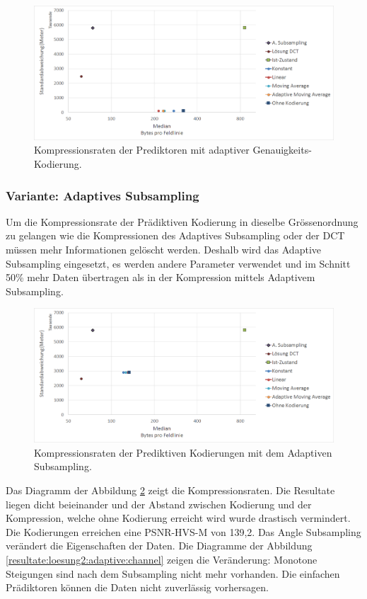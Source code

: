 \begin{figure}[!htbp]
	\center
	\includegraphics[width=1\textwidth,keepaspectratio]{./pictures/resultate/loesung2/variante0/resultate_byte.png}
	\caption{Kompressionsraten der Prediktoren mit adaptiver Genauigkeits-Kodierung.}
	\label{resultate:loesung2:simple:resultate_byte}
\end{figure}

\subsubsection{Variante: Adaptives Subsampling} \label{resultate:loesung2:adaptive}
Um die Kompressionsrate der Prädiktiven Kodierung in dieselbe Grössenordnung zu gelangen wie die Kompressionen des Adaptives Subsampling oder der DCT müssen mehr Informationen gelöscht werden. Deshalb wird das Adaptive Subsampling eingesetzt, es werden andere Parameter verwendet und im Schnitt 50\% mehr Daten übertragen als in der Kompression mittels Adaptivem Subsampling.

\begin{figure}[!htbp]
	\center
	\includegraphics[width=1\textwidth,keepaspectratio]{./pictures/resultate/loesung2/variante1/resultate_euler.png}
	\caption{Kompressionsraten der Prediktiven Kodierungen mit dem Adaptiven Subsampling.}
	\label{resultate:loesung2:adaptive:euler}
\end{figure}
Das Diagramm der Abbildung \ref{resultate:loesung2:adaptive:euler} zeigt die Kompressionsraten. Die Resultate liegen dicht beieinander und der Abstand zwischen Kodierung und der Kompression, welche ohne Kodierung erreicht wird wurde drastisch vermindert. Die Kodierungen erreichen eine PSNR-HVS-M von 139,2. Das Angle Subsampling verändert die Eigenschaften der Daten. Die Diagramme der Abbildung \ref{resultate:loesung2:adaptive:channel} zeigen die Veränderung: Monotone Steigungen sind nach dem Subsampling nicht mehr vorhanden. Die einfachen Prädiktoren können die Daten nicht zuverlässig vorhersagen.

